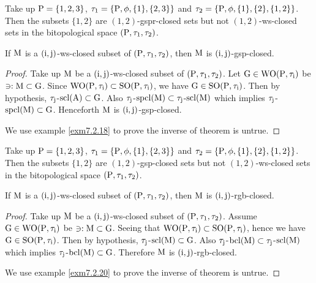 \begin{exm}\label{exm7.2.16}
Take up $\mathrm{P}=\{1, 2, 3\}$, $\tau_1 =\{\mathrm{P}, \phi, \{1\}, \{ 2,3\}\}$ and $\tau_2 =\{\TSP, \phi, \{1\},\break \{2\},\{1,2\}\}$. Then the subsets $\{1,2\}$ are $(1, 2)$-gspr-closed sets but not $(1, 2)$-ws-closed sets in the bitopological space $(\mathrm{P}, \tau_1, \tau_2 )$.
\end{exm}

\begin{thm}\label{thm7.2.17}
If $\mathrm{M}$ is a $(\mathrm{i}, \mathrm{j})$-ws-closed subset of $(\mathrm{P}, \tau_1, \tau_2 )$, then $\mathrm{M}$ is $(\mathrm{i}, \mathrm{j})$-gsp-closed.
\end{thm}

\begin{proof}
Take up $\mathrm{M}$ be a $(\mathrm{i}, \mathrm{j})$-ws-closed subset of $(\mathrm{P}, \tau_1, \tau_2)$. Let $\mathrm{G}\in\mathrm{W}\mathrm{O}(\mathrm{P}, \tau_{\mathrm{i}} )$ be $\ni: \mathrm{M} \subset \mathrm{G}$. Since $\mathrm{W}\mathrm{O}(\mathrm{P}, \tau_{\mathrm{i}}) \subset \mathrm{S}\mathrm{O}(\mathrm{P}, \tau_{\mathrm{i}})$, we have $\mathrm{G}\in\mathrm{S}\mathrm{O}(\mathrm{P}, \tau_{\mathrm{i}})$. Then by hypothesis, $\tau_{\mathrm{j}}$-$\mathrm{scl}(\mathrm{A}) \subset \mathrm{G}$. Also $\tau_{\mathrm{j}}$-$\mathrm{spcl}(\mathrm{M}) \subset \tau_{\mathrm{j}}$-$\mathrm{scl}(\mathrm{M})$ which implies $\tau_{\mathrm{j}}$-$\mathrm{spcl}(\mathrm{M}) \subset \mathrm{G}$. Henceforth $\mathrm{M}$ is $(\mathrm{i}, \mathrm{j})$-gsp-closed.

We use example \ref{exm7.2.18} to prove the inverse of theorem is untrue.
\end{proof}

\begin{exm}\label{exm7.2.18}
Take up $\mathrm{P}=\{1,2,3\}$, $\tau_1 =\{\mathrm{P}, \phi, \{1\}, \{2, 3\}\}$ and $\tau_2 =\{\TSP, \phi, \{1\},\break \{2\},\{1,2\}\}$. Then the subsets $\{1,2\}$ are $(1, 2)$-gsp-closed sets but not $(1, 2)$-ws-closed sets in the bitopological space $(\mathrm{P}, \tau_1, \tau_2 )$.
\end{exm}

\begin{thm}\label{thm7.2.19}
If $\mathrm{M}$ is a $(\mathrm{i}, \mathrm{j})$-ws-closed subset of $(\mathrm{P}, \tau_1, \tau_2 )$, then $\mathrm{M}$ is $(\mathrm{i}, \mathrm{j})$-rgb-closed.
\end{thm}

\begin{proof}
Take up $\mathrm{M}$ be a $(\mathrm{i}, \mathrm{j})$-ws-closed subset of $(\mathrm{P}, \tau_1, \tau_2 )$. Assume $\mathrm{G}\in\mathrm{W}\mathrm{O}(\mathrm{P}, \tau_{\mathrm{i}} )$ be $\ni: \mathrm{M} \subset\mathrm{G}$. Seeing that $\mathrm{W}\mathrm{O}(\mathrm{P}, \tau_{\mathrm{i}} ) \subset \mathrm{S}\mathrm{O}(\mathrm{P}, \tau_{\mathrm{i}} )$, hence we have $\mathrm{G}\in\mathrm{SO}(\mathrm{P}, \tau_{\mathrm{i}} )$. Then by hypothesis, $\tau_{\mathrm{j}}$-$\mathrm{scl}(\mathrm{M}) \subset \mathrm{G}$. Also $\tau_{\mathrm{j}}$-$\mathrm{bcl}(\mathrm{M}) \subset \tau_{\mathrm{j}}$-$\mathrm{scl}(\mathrm{M})$ which implies $\tau_{\mathrm{j}}$-$\mathrm{bcl}(\mathrm{M}) \subset \mathrm{G}$. Therefore $\mathrm{M}$ is $(\mathrm{i}, \mathrm{j})$-rgb-closed.

We use example \ref{exm7.2.20} to prove the inverse of theorem is untrue.
\end{proof}

